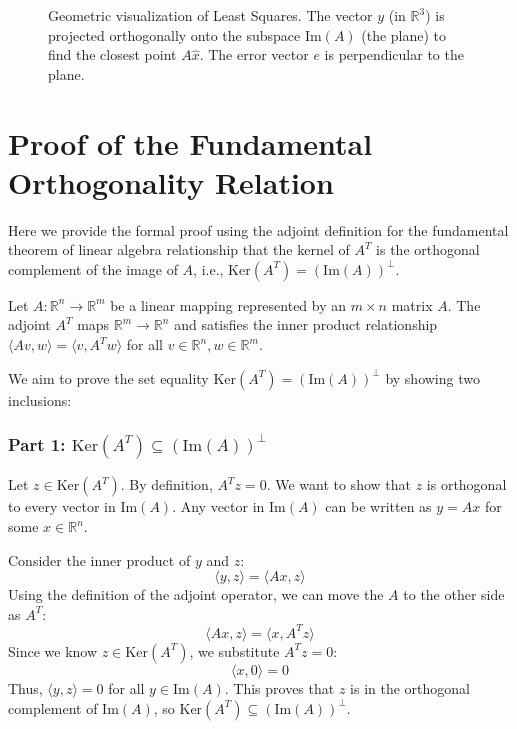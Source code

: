 \begin{notechapter}
\begin{figure}[h!]
    \caption{Geometric visualization of Least Squares. The vector $y$ (in $\mathbb{R}^3$) is projected orthogonally onto the subspace $\text{Im}(A)$ (the plane) to find the closest point $A\hat{x}$. The error vector $e$ is perpendicular to the plane.}
\end{figure}

\chapterappendix
\section{Proof of the Fundamental Orthogonality Relation}

Here we provide the formal proof using the adjoint definition for the fundamental theorem of linear algebra relationship that the kernel of $A^T$ is the orthogonal complement of the image of $A$, i.e., $\text{Ker}(A^{T})=(\text{Im}(A))^{\perp }$.

Let $A: \mathbb{R}^n \to \mathbb{R}^m$ be a linear mapping represented by an $m \times n$ matrix $A$. The adjoint $A^T$ maps $\mathbb{R}^m \to \mathbb{R}^n$ and satisfies the inner product relationship $\langle Av, w \rangle = \langle v, A^Tw \rangle$ for all $v \in \mathbb{R}^n, w \in \mathbb{R}^m$.

We aim to prove the set equality $\text{Ker}(A^T) = (\text{Im}(A))^\perp$ by showing two inclusions:

\subsubsection*{Part 1: $\text{Ker}(A^T) \subseteq (\text{Im}(A))^\perp$}

Let $z \in \text{Ker}(A^T)$. By definition, $A^T z = 0$.
We want to show that $z$ is orthogonal to every vector in $\text{Im}(A)$. Any vector in $\text{Im}(A)$ can be written as $y = Ax$ for some $x \in \mathbb{R}^n$.

Consider the inner product of $y$ and $z$:
$$ \langle y, z \rangle = \langle Ax, z \rangle $$
Using the definition of the adjoint operator, we can move the $A$ to the other side as $A^T$:
$$ \langle Ax, z \rangle = \langle x, A^Tz \rangle $$
Since we know $z \in \text{Ker}(A^T)$, we substitute $A^Tz = 0$:
$$ \langle x, 0 \rangle = 0 $$
Thus, $\langle y, z \rangle = 0$ for all $y \in \text{Im}(A)$. This proves that $z$ is in the orthogonal complement of $\text{Im}(A)$, so $\text{Ker}(A^T) \subseteq (\text{Im}(A))^\perp$.


\end{notechapter}
